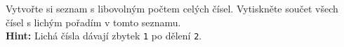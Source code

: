 \question[50]
Vytvořte si seznam s libovolným počtem celých čísel. Vytiskněte součet všech
čísel s lichým pořadím v tomto seznamu.\\
\textbf{Hint:} Lichá čísla dávají zbytek \texttt{1} po dělení \texttt{2}.